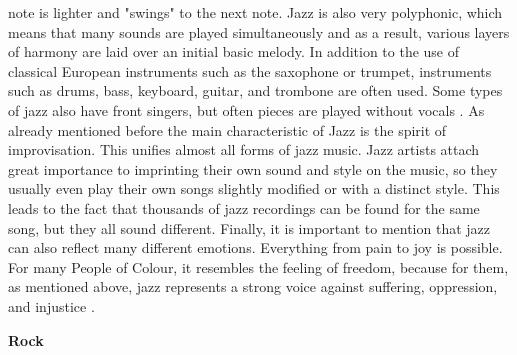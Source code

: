 note is lighter and "swings" to the next note.
Jazz is also very polyphonic, which means that many sounds are played simultaneously and as a result,
various layers of harmony are laid over an initial basic melody.
In addition to the use of classical European instruments such as the saxophone or trumpet,
instruments such as drums, bass, keyboard, guitar, and trombone are often used.
Some types of jazz also have front singers, but often pieces are played without vocals \cite{2020MasterclassJazz}.
As already mentioned before the main characteristic of Jazz is
the spirit of improvisation. This unifies almost all forms of jazz music.
Jazz artists attach great importance to imprinting their own sound and style on the music,
so they usually even play their own songs slightly modified or with a distinct style.
This leads to the fact that thousands of jazz recordings can be found for the same song,
but they all sound different.
Finally, it is important to mention that jazz can also reflect many different emotions.
Everything from pain to joy is possible. For many People of Colour, it resembles the feeling of freedom,
because for them, as mentioned above, jazz represents a strong voice against suffering, oppression,
and injustice \cite{MusicalDictJazz}.

\textbf{Rock}

